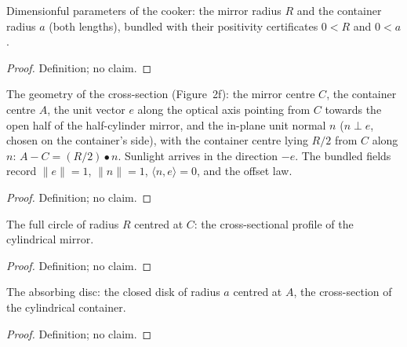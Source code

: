 \begin{definition}
\label{def:IPhO2026Problems_problem_IPhO_2026_2_B_2:CookerParams}
Dimensionful parameters of the cooker: the mirror radius $R$ and the
container radius $a$ (both lengths), bundled with their positivity
certificates $0 < R$ and $0 < a$.
\end{definition}
\begin{proof}
Definition; no claim.
\end{proof}

\begin{definition}
\label{def:IPhO2026Problems_problem_IPhO_2026_2_B_2:CookerGeometry}
The geometry of the cross-section (Figure~2f): the mirror centre $C$, the
container centre $A$, the unit vector $e$ along the optical axis pointing
from $C$ towards the open half of the half-cylinder mirror, and the
in-plane unit normal $n$ ($n \perp e$, chosen on the container's side),
with the container centre lying $R/2$ from $C$ along $n$:
$A - C = (R/2) \bullet n$.  Sunlight arrives in the direction $-e$.
The bundled fields record $\|e\| = 1$, $\|n\| = 1$,
$\langle n, e \rangle = 0$, and the offset law.
\end{definition}
\begin{proof}
Definition; no claim.
\end{proof}

\begin{definition}
\label{def:IPhO2026Problems_problem_IPhO_2026_2_B_2:mirrorCircle}
The full circle of radius $R$ centred at $C$: the cross-sectional profile
of the cylindrical mirror.
\end{definition}
\begin{proof}
Definition; no claim.
\end{proof}

\begin{definition}
\label{def:IPhO2026Problems_problem_IPhO_2026_2_B_2:containerDisk}
The absorbing disc: the closed disk of radius $a$ centred at $A$, the
cross-section of the cylindrical container.
\end{definition}
\begin{proof}
Definition; no claim.
\end{proof}


